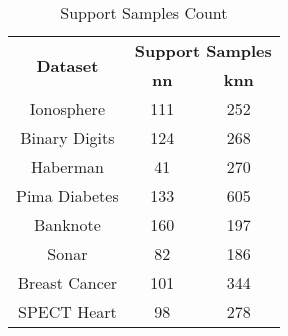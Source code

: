 \begin{table}[htbp]
\caption{Support Samples Count}
\begin{center}
\begin{tabular}{|c|c|c|}
\hline
\multirow{2}{*}{\textbf{Dataset}} & \multicolumn{2}{c|}{\textbf{Support Samples}} \\ \cline{2-3}
 & \textbf{nn} & \textbf{knn} \\ \hline
Ionosphere & 111 & 252 \\ \hline
Binary Digits & 124 & 268 \\ \hline
Haberman & 41 & 270 \\ \hline
Pima Diabetes & 133 & 605 \\ \hline
Banknote & 160 & 197 \\ \hline
Sonar & 82 & 186 \\ \hline
Breast Cancer & 101 & 344 \\ \hline
SPECT Heart & 98 & 278 \\ \hline
\end{tabular}
\label{tab:support}
\end{center}
\end{table}
